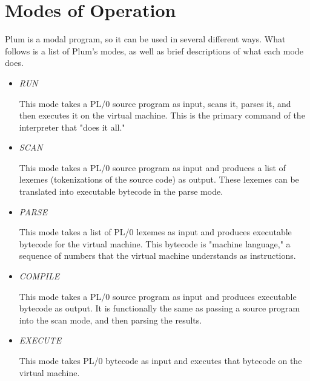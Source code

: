 \documentclass[12pt]{memoir}
\begin{document}
\pagebreak

\section*{Modes of Operation}
Plum is a modal program, so it can be used in several different ways. What follows
is a list of Plum's modes, as well as brief descriptions of what each mode does.
\begin{itemize}
    \item \emph{RUN}

        This mode takes a PL/0 source program as input, scans it, parses it, and then
        executes it on the virtual machine. This is the primary command of the interpreter
        that "does it all."

    \item \emph{SCAN}

        This mode takes a PL/0 source program as input and produces a list of lexemes
        (tokenizations of the source code) as output. These lexemes can be translated
        into executable bytecode in the parse mode.

    \item \emph{PARSE}
        
        This mode takes a list of PL/0 lexemes as input and produces executable bytecode
        for the virtual machine. This bytecode is "machine language," a sequence of numbers
        that the virtual machine understands as instructions.

    \item \emph{COMPILE}

        This mode takes a PL/0 source program as input and produces executable bytecode
        as output. It is functionally the same as passing a source program into the scan
        mode, and then parsing the results.

    \item \emph{EXECUTE}

        This mode takes PL/0 bytecode as input and executes that bytecode on the virtual
        machine.
\end{itemize}
\end{document}
